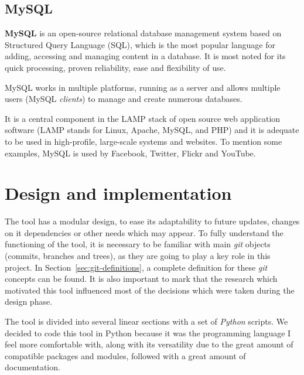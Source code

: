 \documentclass[a4paper, 12pt]{book}
\begin{document}
\section{MySQL}

\textbf{MySQL} is an open-source relational database management system based on Structured Query Language (SQL),
which is the most popular language for adding, accessing and managing content in a database. It is most noted for its quick processing,
proven reliability, ease and flexibility of use.

MySQL works in multiple platforms, running as a server and allows multiple users (MySQL \emph{clients}) to manage and create numerous databases.

It is a central component in the LAMP stack of open source web application
software (LAMP stands for Linux, Apache, MySQL, and PHP) and it is adequate to be used in high-profile, large-scale systems and websites.
To mention some examples, MySQL is used by Facebook, Twitter, Flickr and YouTube.

\cleardoublepage
\chapter{Design and implementation}
\label{sec:design-implementation}

The tool has a modular design, to ease its adaptability to future updates, changes on it dependencies or other needs which may appear.
To fully understand the functioning of the tool, it is necessary to be familiar with main \emph{git} objects (commits, branches and trees),
as they are going to play a key role in this project. In Section~\ref{sec:git-definitions}, a complete definition for these \emph{git} concepts can be found.
It is also important to mark that the research which motivated this tool influenced most of the decisions which were taken during the design phase.

The tool is divided into several linear sections with a set of \emph{Python} scripts. We decided to code this tool in Python because it was the programming
language I feel more comfortable with, along with its versatility due to the great amount of compatible packages and modules, followed
with a great amount of documentation.
\end{document}
